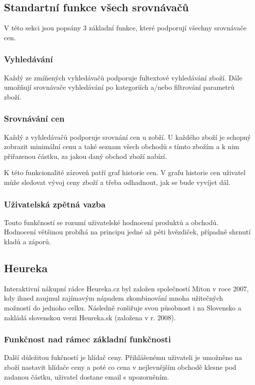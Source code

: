 \subsection{Standartní funkce všech srovnávačů}
V této sekci jsou popsány 3 základní funkce, které podporují všechny srovnávače cen.

\subsubsection{Vyhledávání}
Každý ze zmíňených vyhledávačů podporuje fultextové vyhledávání zboží. Dále umožňují srovnávače vyhledávání po kategoriích a/nebo filtrování parametrů zboží.

\subsubsection{Srovnávání cen}
Každý z vyhledávačů podporuje srovnání cen u zobží. U každého zboží je schopný zobrazit minimální cenu a také seznam všech obchodů s tímto zbožím a k nim přiřazenou částku, za jakou daný obchod zboží nabízí.

K této funkcionalitě zároveň patří graf historie cen. V grafu historie cen uživatel může sledovat vývoj ceny zboží a třeba odhadnout, jak se bude vyvíjet dál.

\subsubsection{Uživatelská zpětná vazba}
Touto funkčností se rozumí uživatelské hodnocení produktů a obchodů. Hodnocení většinou probíhá na principu jedné až pěti hvězdiček, případně shrnutí kladů a záporů.

\subsection{Heureka}
Interaktivní nákupní rádce Heureka.cz byl založen společností Miton v roce 2007, kdy ihned zaujmul zajímavým nápadem zkombinování mnoha užitečných možností do jednoho celku. Následně rozšiřuje svou působnost i na Slovensko a zakládá slovenskou verzi Heureka.sk (založena v r. 2008). \cite{website:wiki:heureka}

\subsubsection{Funkčnost nad rámec základní funkčnosti}
Další důležitou fukčností je hlídač ceny. Přihlášenému uživateli je umožněno na zboží nastavit hlídače ceny a poté co cena v nejlevnějším obchodě klesne pod zadanou částku, uživatel dostane email s upozorněním.

